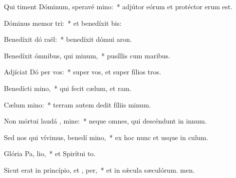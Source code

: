 \item Qui timent Dóminum, speravé  mino:~* adjútor eórum et protéctor erum est.
\item Dóminus memor  tri:~* et benedíxit bis:
\item Benedíxit dó raël:~* benedíxit dómui aron.
\item Benedíxit ómnibus, qui  minum,~* pusíllis cum maribus.
\item Adjíciat Dó per vos:~* super vos, et super fílios tros.
\item Benedícti   mino,~* qui fecit cælum, et ram.
\item Cælum  mino:~* terram autem dedit fíliis minum.
\item Non mórtui laudá , mine:~* neque omnes, qui descéndunt in innum.
\item Sed nos qui vívimus, benedí mino,~* ex hoc nunc et usque in culum.
\item Glória Pa,  lio,~* et Spirítui to.
\item Sicut erat in princípio, et ,  per,~* et in sǽcula sæculórum. men.
